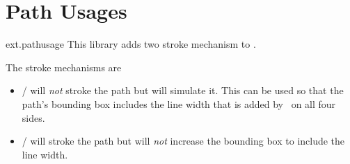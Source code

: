 %
%
%

\section{Path Usages}
\label{pgflibrary:pathusage}
\begin{purepgflibrary}{ext.pathusage}
  This library adds two stroke mechanism to \pgfname.
\end{purepgflibrary}

The stroke mechanisms are
\begin{itemize}
\item {}/ will \emph{not} stroke the path
      but will simulate it. This can be used so that the path's
      bounding box includes the line width that is added by \pgfname\ 
      on all four sides.
\item {}/ will stroke the path
      but will \emph{not} increase the bounding box to include the line width.
\end{itemize}